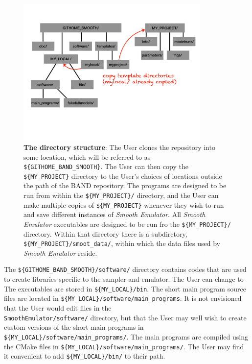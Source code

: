 \documentclass[UserManual.tex]{subfiles}
\begin{document}
\begin{figure}
\centerline{\includegraphics[width = 0.85\textwidth]{directorystructure}}
\caption{{\bf The directory structure}: The User clones the repository into some location, which will be referred to as {\tt \$\{\tt GITHOME\_BAND\_SMOOTH\}}. The User can then copy the {\tt  \$\{MY\_PROJECT\}} directory to the User's choices of locations outside the path of the BAND repository.  The programs are designed to be run from within the {\tt \$\{MY\_PROJECT\}/} directory, and the User can make multiple copies of {\tt  \$\{MY\_PROJECT\}} whenever they wish to run and save different instances of {\it Smooth Emulator}. All {\it Smooth Emulator} executables are designed to be run fro the {\tt \$\{MY\_PROJECT\}/} directory. Within that directory there is a subdirctory, {\tt  \$\{MY\_PROJECT\}/smoot\_data/}, within which the data files used by {\it Smooth Emulator} reside.
}
\end{figure}

The {\tt \$\{GITHOME\_BAND\_SMOOTH\}/software/} directory contains codes that are used to create libraries specific to the sampler and emulator. The User can change to The executables are stored in {\tt \$\{MY\_LOCAL\}/bin}. The short main program source files are located in {\tt \$\{MY\_LOCAL\}/software/main\_programs}. It is not envisioned that the User would edit files in the\\{\tt SmoothEmulator/software/} directory, but that the User may well wish to create custom versions of the short main programs in {\tt \$\{MY\_LOCAL\}/software/main\_programs/}. The main programs are compiled using the CMake files in {\tt \$\{MY\_LOCAL\}/software/main\_programs/}. The User may find it convenient to add {\tt \$\{MY\_LOCAL\}/bin/} to their path.
\end{document}
